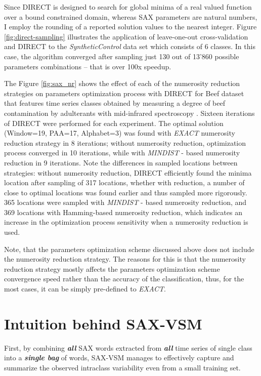 Since DIRECT is designed to search for global minima of a real valued function over a bound constrained domain, 
whereas SAX parameters are natural numbers, I employ the rounding of a reported solution values to the nearest integer.
Figure \ref{fig:direct-sampling} illustrates the application of leave-one-out cross-validation and DIRECT to the
\textit{SyntheticControl} data set \cite{ucr} which consists of 6 classes. 
In this case, the algorithm converged after sampling just 130 out of 13'860 possible parameters combinations -- 
that is over 100x speedup.

The Figure \ref{fig:sax_nr} shows the effect of each of the numerosity reduction strategies on parameters optimization
process with DIRECT for Beef dataset that features time series classes obtained by measuring a degree of beef contamination 
by adulterants with mid-infrared spectroscopy \cite{citeulike:12859637}. 
Sixteen iterations of DIRECT were performed for each experiment. 
The optimal solution (Window=19, PAA=17, Alphabet=3) was found with \textit{EXACT} numerosity reduction strategy 
in 8 iterations; without numerosity reduction, optimization process converged in 10 iterations, while 
with \textit{MINDIST} - based numerosity reduction in 9 iterations. 
Note the differences in sampled locations between strategies: without numerosity reduction, DIRECT efficiently found 
the minima location after sampling of 317 locations, whether with reduction, a number of close to optimal locations was 
found earlier and thus sampled more rigorously. 
365 locations were sampled with \textit{MINDIST} - based numerosity reduction, and 369 locations with Hamming-based 
numerosity reduction, which indicates an increase in the optimization process sensitivity when a numerosity reduction is used.

Note, that the parameters optimization scheme discussed above does not include the numerosity reduction strategy.
The reasons for this is that the numerosity reduction strategy mostly affects the parameters optimization scheme 
convergence speed rather than the accuracy of the classification, thus, for the most cases, it can be simply pre-defined 
to \textit{EXACT}.

\section{Intuition behind SAX-VSM}
First, by combining \textit{\textbf{all}} SAX words extracted from 
\textit{\textbf{all}} time series of single class into a \textit{\textbf{single bag}} of 
words, SAX-VSM manages to effectively capture and summarize the observed intraclass variability 
even from a small training set.  

